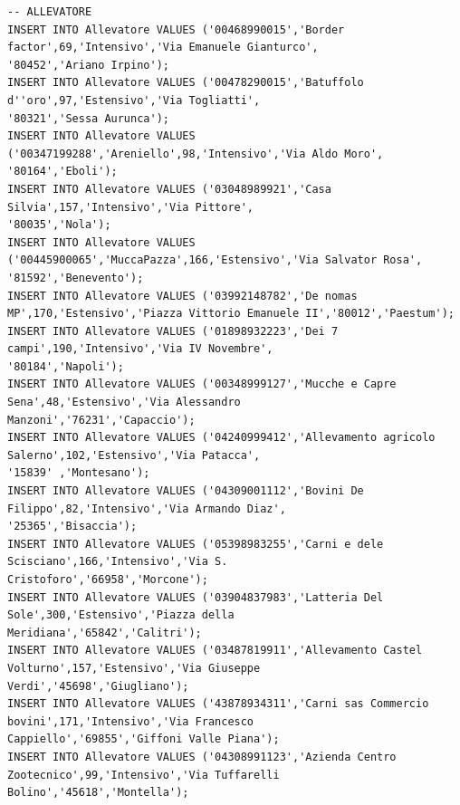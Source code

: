 \documentclass[12pt]{report}
\begin{document}
\begin{scriptsize}
\begin{verbatim}
-- ALLEVATORE
INSERT INTO Allevatore VALUES ('00468990015','Border factor',69,'Intensivo','Via Emanuele Gianturco', 
'80452','Ariano Irpino');
INSERT INTO Allevatore VALUES ('00478290015','Batuffolo d''oro',97,'Estensivo','Via Togliatti',
'80321','Sessa Aurunca');
INSERT INTO Allevatore VALUES ('00347199288','Areniello',98,'Intensivo','Via Aldo Moro',
'80164','Eboli');
INSERT INTO Allevatore VALUES ('03048989921','Casa Silvia',157,'Intensivo','Via Pittore',
'80035','Nola');
INSERT INTO Allevatore VALUES ('00445900065','MuccaPazza',166,'Estensivo','Via Salvator Rosa',
'81592','Benevento');
INSERT INTO Allevatore VALUES ('03992148782','De nomas MP',170,'Estensivo','Piazza Vittorio Emanuele II','80012','Paestum');
INSERT INTO Allevatore VALUES ('01898932223','Dei 7 campi',190,'Intensivo','Via IV Novembre',
'80184','Napoli');
INSERT INTO Allevatore VALUES ('00348999127','Mucche e Capre Sena',48,'Estensivo','Via Alessandro 
Manzoni','76231','Capaccio');
INSERT INTO Allevatore VALUES ('04240999412','Allevamento agricolo Salerno',102,'Estensivo','Via Patacca',
'15839' ,'Montesano');
INSERT INTO Allevatore VALUES ('04309001112','Bovini De Filippo',82,'Intensivo','Via Armando Diaz',
'25365','Bisaccia');
INSERT INTO Allevatore VALUES ('05398983255','Carni e dele Scisciano',166,'Intensivo','Via S. 
Cristoforo','66958','Morcone');
INSERT INTO Allevatore VALUES ('03904837983','Latteria Del Sole',300,'Estensivo','Piazza della 
Meridiana','65842','Calitri');
INSERT INTO Allevatore VALUES ('03487819911','Allevamento Castel Volturno',157,'Estensivo','Via Giuseppe 
Verdi','45698','Giugliano');
INSERT INTO Allevatore VALUES ('43878934311','Carni sas Commercio bovini',171,'Intensivo','Via Francesco 
Cappiello','69855','Giffoni Valle Piana');
INSERT INTO Allevatore VALUES ('04308991123','Azienda Centro Zootecnico',99,'Intensivo','Via Tuffarelli 
Bolino','45618','Montella');


\end{verbatim}
\end{scriptsize}
\end{document}
